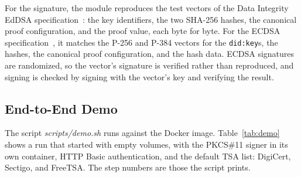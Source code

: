 \documentclass[11pt,a4paper]{article}
\newcommand{\code}[1]{\texttt{#1}}
\newcommand{\file}[1]{\textit{#1}}
\begin{document}
For the signature, the module reproduces the test vectors of the Data Integrity EdDSA
specification~\cite{eddsa}: the key identifiers, the two SHA-256 hashes, the canonical proof
configuration, and the proof value, each byte for byte. For the ECDSA
specification~\cite{ecdsa}, it matches the P-256 and P-384 vectors for the \code{did:key}s, the
hashes, the canonical proof configuration, and the hash data. ECDSA signatures are randomized,
so the vector's signature is verified rather than reproduced, and signing is checked by signing
with the vector's key and verifying the result.

\subsection{End-to-End Demo}
\label{sec:demo}

The script \file{scripts/demo.sh} runs against the Docker image. Table~\ref{tab:demo} shows a
run that started with empty volumes, with the PKCS\#11 signer in its own container, HTTP Basic
authentication, and the default TSA list: DigiCert, Sectigo, and FreeTSA. The step numbers are
those the script prints.
\end{document}
